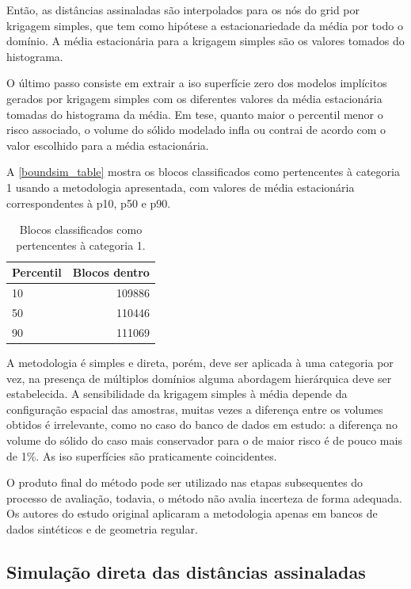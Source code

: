 Então, as distâncias assinaladas são interpolados para os nós do grid por krigagem simples, que tem como hipótese a estacionariedade da média por todo o domínio. A média estacionária para a krigagem simples são os valores tomados do histograma.

O último passo consiste em extrair a iso superfície zero dos modelos implícitos gerados por krigagem simples com os diferentes valores da média estacionária tomadas do histograma da média. Em tese, quanto maior o percentil menor o risco associado, o volume do sólido modelado infla ou contrai de acordo com o valor escolhido para a média estacionária.

A \autoref{boundsim_table} mostra os blocos classificados como pertencentes à categoria 1 usando a metodologia apresentada, com valores de média estacionária correspondentes à p10, p50 e p90.

\begin{table}[H]
\begin{center}
\begin{tabular}{lr}
Percentil & \multicolumn{1}{l}{Blocos dentro} \\ \hline
10 & 109886 \\
50 & 110446 \\
90 & 111069 \\ \hline
\end{tabular}
\end{center}
\caption{Blocos classificados como pertencentes à categoria 1.}\label{boundsim_table}
\end{table}

A metodologia é simples e direta, porém, deve ser aplicada à uma categoria por vez, na presença de múltiplos domínios alguma abordagem hierárquica deve ser estabelecida. A sensibilidade da krigagem simples à média depende da configuração espacial das amostras, muitas vezes a diferença entre os volumes obtidos é irrelevante, como no caso do banco de dados em estudo: a diferença no volume do sólido do caso mais conservador para o de maior risco é de pouco mais de 1\%. As iso superfícies são praticamente coincidentes.

O produto final do método pode ser utilizado nas etapas subsequentes do processo de avaliação, todavia, o método não avalia incerteza de forma adequada. Os autores do estudo original aplicaram a metodologia apenas em bancos de dados sintéticos e de geometria regular. 

\subsection{Simulação direta das distâncias assinaladas}\label{sim_direta}

